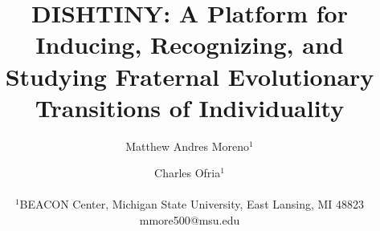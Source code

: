 \documentclass[letterpaper]{article}
\title{DISHTINY: A Platform for Inducing, Recognizing, and Studying Fraternal Evolutionary Transitions of Individuality}
\author{Matthew Andres Moreno$^{1}$ \and Charles Ofria$^{1}$ \\
\mbox{}\\
$^1$BEACON Center, Michigan State University, East Lansing, MI 48823 \\
mmore500@msu.edu} %
\begin{document}
\maketitle













\footnotesize

\end{document}
